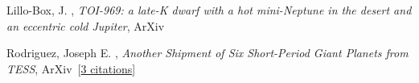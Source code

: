 \item[{\color{numcolor}\scriptsize2}] Lillo-Box, J. , \emph{TOI-969: a late-K dwarf with a hot mini-Neptune in the desert and an eccentric cold Jupiter}, ArXiv\

\item[{\color{numcolor}\scriptsize1}] Rodriguez, Joseph E. , \emph{Another Shipment of Six Short-Period Giant Planets from TESS}, ArXiv\  [\href{https://ui.adsabs.harvard.edu/abs/2022arXiv220505709R}{3 citations}]
